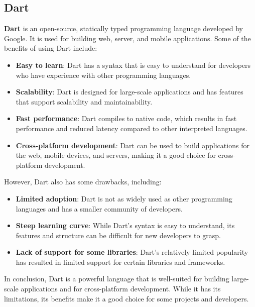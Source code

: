 \subsection{Dart}
\textbf{Dart} is an open-source, statically typed programming language developed by Google. It is used for building web, server, and mobile applications. Some of the benefits of using Dart include:
\begin{itemize}
    \item \textbf{Easy to learn}: Dart has a syntax that is easy to understand for developers who have experience with other programming languages.
    \item \textbf{Scalability}: Dart is designed for large-scale applications and has features that support scalability and maintainability.
    \item \textbf{Fast performance}: Dart compiles to native code, which results in fast performance and reduced latency compared to other interpreted languages.
    \item \textbf{Cross-platform development}: Dart can be used to build applications for the web, mobile devices, and servers, making it a good choice for cross-platform development.
\end{itemize}
However, Dart also has some drawbacks, including:
\begin{itemize}
    \item \textbf{Limited adoption}: Dart is not as widely used as other programming languages and has a smaller community of developers.
    \item \textbf{Steep learning curve}: While Dart's syntax is easy to understand, its features and structure can be difficult for new developers to grasp.
    \item \textbf{Lack of support for some libraries}: Dart's relatively limited popularity has resulted in limited support for certain libraries and frameworks.
\end{itemize}
In conclusion, Dart is a powerful language that is well-suited for building large-scale applications and for cross-platform development. While it has its limitations, its benefits make it a good choice for some projects and developers.
